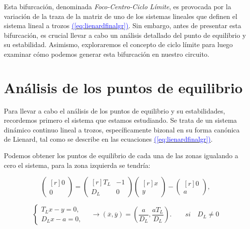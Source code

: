 \documentclass[12pt,a4paper]{report} %
\newcommand{\eref}[1]{\hyperref[#1]{\textcolor{blue}{(\ref*{#1})}}}
\begin{document}
	\vspace{0.5cm} Esta bifurcación, denominada \textit{Foco-Centro-Ciclo Límite}, es provocada por la variación de la traza de la matriz de uno de los sistemas lineales que definen el sistema lineal a trozos \eref{eq:lienardfinalgr}. Sin embargo, antes de presentar esta bifurcación, es crucial llevar a cabo un análisis detallado del punto de equilibrio y su estabilidad. Asimismo, exploraremos el concepto de ciclo límite para luego examinar cómo podemos generar esta bifurcación en nuestro circuito.
	
	\section{Análisis de los puntos de equilibrio}
	\label{sec:41}
	
		Para llevar a cabo el análisis de los puntos de equilibrio y su estabilidades, recordemos primero el sistema que estamos estudiando. Se trata de un sistema dinámico continuo lineal a trozos, específicamente bizonal en su forma canónica de Lienard, tal como se describe en las ecuaciones \eref{eq:lienardfinalgr}.
		
		\vspace{0.5cm}Podemos obtener los puntos de equilibrio de cada una de las zonas igualando a cero el sistema, para la zona izquierda se tendría:

		
		\begin{equation*}
			\begin{pmatrix*}[r]
				0\\ 0
			\end{pmatrix*}= \begin{pmatrix*}[r]
				T_L & -1 \\ D_L & 0
			\end{pmatrix*} \begin{pmatrix*}[r]
				x \\ y
			\end{pmatrix*}-\begin{pmatrix*}[r]
				0 \\ a
			\end{pmatrix*},
		\end{equation*}\smallskip
		
		\begin{equation}
			\label{eq:eqpointL}
			\left\{
			\begin{aligned}
				T_Lx-y=0,\\
				D_Lx-a=0,
			\end{aligned}
			\right. \quad \longrightarrow \left( \overline{x},\overline{y} \right)=\left( \frac{a}{D_L},\frac{aT_L}{D_L} \right). \qquad si \quad D_L\neq0
		\end{equation}\smallskip
		
\end{document}
